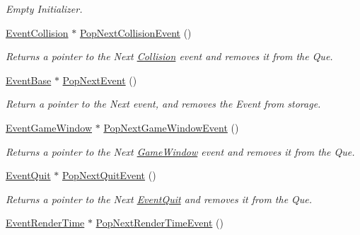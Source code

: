 \begin{DoxyCompactItemize}
\begin{DoxyCompactList}\small\item\em Empty Initializer. \item\end{DoxyCompactList}\item 
\hyperlink{classMezzanine_1_1EventCollision}{EventCollision} $\ast$ \hyperlink{classMezzanine_1_1EventManager_a25b42c9f5a4ac2910d5e0d79b2bd2c17}{PopNextCollisionEvent} ()
\begin{DoxyCompactList}\small\item\em Returns a pointer to the Next \hyperlink{classMezzanine_1_1Collision}{Collision} event and removes it from the Que. \item\end{DoxyCompactList}\item 
\hyperlink{classMezzanine_1_1EventBase}{EventBase} $\ast$ \hyperlink{classMezzanine_1_1EventManager_a48861de138f2c59480527cf16518444a}{PopNextEvent} ()
\begin{DoxyCompactList}\small\item\em Return a pointer to the Next event, and removes the Event from storage. \item\end{DoxyCompactList}\item 
\hyperlink{classMezzanine_1_1EventGameWindow}{EventGameWindow} $\ast$ \hyperlink{classMezzanine_1_1EventManager_a91f8be3fedf91ba5a32825a8dd97de95}{PopNextGameWindowEvent} ()
\begin{DoxyCompactList}\small\item\em Returns a pointer to the Next \hyperlink{classMezzanine_1_1GameWindow}{GameWindow} event and removes it from the Que. \item\end{DoxyCompactList}\item 
\hyperlink{classMezzanine_1_1EventQuit}{EventQuit} $\ast$ \hyperlink{classMezzanine_1_1EventManager_aa7cefb4728acb84517e2891adc450c27}{PopNextQuitEvent} ()
\begin{DoxyCompactList}\small\item\em Returns a pointer to the Next \hyperlink{classMezzanine_1_1EventQuit}{EventQuit} and removes it from the Que. \item\end{DoxyCompactList}\item 
\hyperlink{classMezzanine_1_1EventRenderTime}{EventRenderTime} $\ast$ \hyperlink{classMezzanine_1_1EventManager_aedbb7374cf4c97a5f5ab5283627da83f}{PopNextRenderTimeEvent} ()

\end{DoxyCompactItemize}
